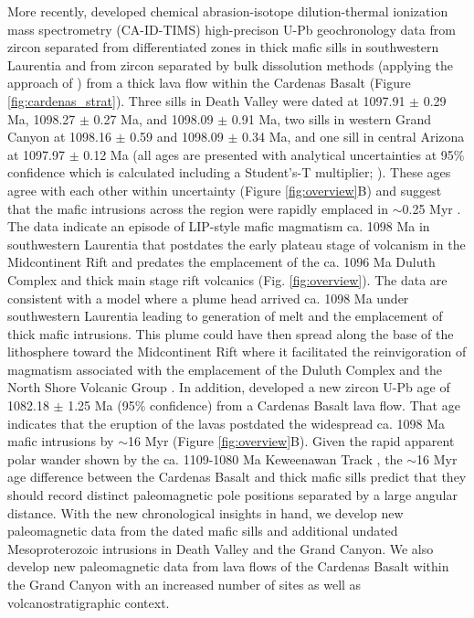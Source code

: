 More recently,  developed chemical abrasion-isotope dilution-thermal ionization mass spectrometry (CA-ID-TIMS) high-precison U-Pb geochronology data from zircon separated from differentiated zones in thick mafic sills in southwestern Laurentia and from zircon separated by bulk dissolution methods (applying the approach of ) from a thick lava flow within the Cardenas Basalt (Figure \ref{fig:cardenas_strat}). Three sills in Death Valley were dated at 1097.91 $\pm$ 0.29 Ma, 1098.27 $\pm$ 0.27 Ma, and 1098.09 $\pm$ 0.91 Ma, two sills in western Grand Canyon at 1098.16 $\pm$ 0.59 and 1098.09 $\pm$ 0.34 Ma, and one sill in central Arizona at 1097.97 $\pm$ 0.12 Ma (all ages are presented with analytical uncertainties at 95\% confidence which is calculated including a Student’s-T multiplier; ). These ages agree with each other within uncertainty (Figure \ref{fig:overview}B) and suggest that the mafic intrusions across the region were rapidly emplaced in $\sim$0.25 Myr \cite{Mohr2024a}. The data indicate an episode of LIP-style mafic magmatism ca. 1098 Ma in southwestern Laurentia that postdates the early plateau stage of volcanism in the Midcontinent Rift and predates the emplacement of the ca. 1096 Ma Duluth Complex and thick main stage rift volcanics (Fig. \ref{fig:overview}). The data are consistent with a model where a plume head arrived ca. 1098 Ma under southwestern Laurentia leading to generation of melt and the emplacement of thick mafic intrusions. This plume could have then spread along the base of the lithosphere toward the Midcontinent Rift where it facilitated the reinvigoration of magmatism associated with the emplacement of the Duluth Complex and the North Shore Volcanic Group \cite{Mohr2024a}. In addition,  developed a new zircon U-Pb age of 1082.18 $\pm$ 1.25 Ma (95\% confidence) from a Cardenas Basalt lava flow. That age indicates that the eruption of the lavas postdated the widespread ca. 1098 Ma mafic intrusions by $\sim$16 Myr (Figure \ref{fig:overview}B). Given the rapid apparent polar wander shown by the ca. 1109-1080 Ma Keweenawan Track \cite{Swanson-Hysell2019a}, the $\sim$16 Myr age difference between the Cardenas Basalt and thick mafic sills predict that they should record distinct paleomagnetic pole positions separated by a large angular distance. With the new chronological insights in hand, we develop new paleomagnetic data from the dated mafic sills and additional undated Mesoproterozoic intrusions in Death Valley and the Grand Canyon. We also develop new paleomagnetic data from lava flows of the Cardenas Basalt within the Grand Canyon with an increased number of sites as well as volcanostratigraphic context. 

